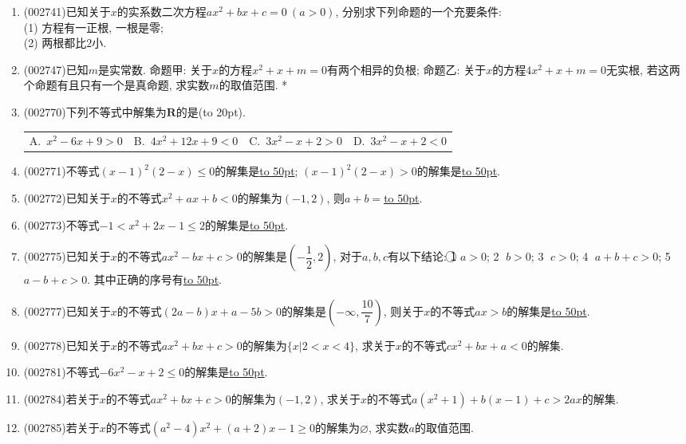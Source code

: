 \documentclass[10pt,a4paper]{article}
\newcommand{\blank}[1]{\underline{\hbox to #1pt{}}}
\newcommand{\bracket}[1]{(\hbox to #1pt{})}
\newcommand{\fourch}[4]{\par\begin{tabular}{p{.23\textwidth}p{.23\textwidth}p{.23\textwidth}p{.23\textwidth}}
A.~#1 &B.~#2& C.~#3& D.~#4
\end{tabular}}
\begin{document}
\begin{enumerate}[1.]
(3) 已知$x,y\in \mathbf{R}$, $p$: $(x-1)^2+(y-2)^2=0$是$q$: $(x-1)(y-2)=0$的\blank{50}条件;\\
*(4) 设$x,y\in \mathbf{R}$, 则``$x^2+y^2<2$''是``$|x|+|y|\le \sqrt2$''的\blank{50}条件; 又是``$|x|+|y|<2$''的\blank{50}条件; 又是``$|x|<\sqrt2$且$|y|<\sqrt2$''的\blank{50}条件.\\
(5) 设$a_1,b_1,c_1,a_2,b_2,c_2$均为非零实数, 方程$a_1x^2+b_1x+c_1=0$和方程$a_2x^2+b_2x+c_2=0$的实数解集分别为$M$和$N$, 则``$\dfrac{a_1}{a_2}=\dfrac{b_1}{b_2}=\dfrac{c_1}{c_2}$''是``$M=N$''的\blank{50}条件.
\item {\tiny (002741)}已知关于$x$的实系数二次方程$a x^2 +bx+c=0\ (a>0)$, 分别求下列命题的一个充要条件:\\
(1) 方程有一正根, 一根是零;\\
(2) 两根都比$2$小.
\item {\tiny (002747)}已知$m$是实常数. 命题甲: 关于$x$的方程$x^2+x+m=0$有两个相异的负根; 命题乙: 关于$x$的方程$4x^2+x+m=0$无实根, 若这两个命题有且只有一个是真命题, 求实数$m$的取值范围.
*
\vspace*{16ex}
\item {\tiny (002770)}下列不等式中解集为$\mathbf{R}$的是\bracket{20}.
\fourch{$x^2-6x+9>0$}{$4x^2+12x+9<0$}{$3x^2-x+2>0$}{$3x^2-x+2<0$}
\item {\tiny (002771)}不等式$(x-1)^2(2-x)\le 0$的解集是\blank{50}; $(x-1)^2(2-x)>0$的解集是\blank{50}.
\item {\tiny (002772)}已知关于$x$的不等式$x^2+ax+b<0$的解集为$(-1,2)$, 则$a+b=$\blank{50}.
\item {\tiny (002773)}不等式$-1<x^2+2x-1\le 2$的解集是\blank{50}.
\item {\tiny (002775)}已知关于$x$的不等式$ax^2-bx+c>0$的解集是$(-\dfrac 12,2)$, 对于$a,b,c$有以下结论: \textcircled{1} $a>0$; \textcircled{2} $b>0$; \textcircled{3} $c>0$; \textcircled{4} $a+b+c>0$; \textcircled{5} $a-b+c>0$. 其中正确的序号有\blank{50}.
\item {\tiny (002777)}已知关于$x$的不等式$(2a-b)x+a-5b>0$的解集是$(-\infty,\dfrac{10}7)$, 则关于$x$的不等式$ax>b$的解集是\blank{50}.
\item {\tiny (002778)}已知关于$x$的不等式$ax^2+bx+c>0$的解集为$\{x|2<x<4\}$, 求关于$x$的不等式$cx^2+bx+a<0$的解集.
\item {\tiny (002781)}不等式$-6x^2-x+2\le 0$的解集是\blank{50}.
\item {\tiny (002784)}若关于$x$的不等式$ax^2+bx+c>0$的解集为$(-1,2)$, 求关于$x$的不等式$a(x^2+1)+b(x-1)+c>2ax$的解集.
\item {\tiny (002785)}若关于$x$的不等式$(a^2-4)x^2+(a+2)x-1\ge 0$的解集为$\varnothing$, 求实数$a$的取值范围.

\end{enumerate}
\end{document}
